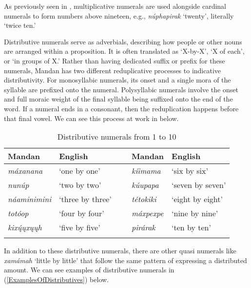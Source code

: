 As previously seen in , multiplicative numerals are used alongside cardinal numerals to form numbers above nineteen, e.g., \textit{núphapirak} `twenty', literally `twice ten.'

\label{SubSubSubDistributive}

Distributive numerals serve as adverbials, describing how people or other nouns are arranged within a proposition. It is often translated as `X-by-X', `X of each', or `in groups of X.' Rather than having dedicated suffix or prefix for these numerals, Mandan has two different reduplicative processes to indicative distributivity. For monosyllabic numerals, its onset and a single mora of the syllable are prefixed onto the numeral. Polysyllabic numerals involve the onset and full moraic weight of the final syllable being suffixed onto the end of the word. If a numeral ends in a consonant, then the reduplication happens before that final vowel. We can see this process at work in  below.

\begin{table}
        \caption{Distributive numerals from 1 to 10}\label{Tab1to10distributive}
    \begin{tabular}{lllll}
\lsptoprule
    \textbf{Mandan}&\textbf{English}& ~&  \textbf{Mandan}&\textbf{English}\\
\midrule
    \textit{máxanana}&`one by one'&~&  \textit{kíimama}&`six by six'\\
    \textit{nunúp}&`two by two'&~&     \textit{kúupapa}&`seven by seven'\\
    \textit{náaminimini}&`three by three'&~&   \textit{tétokiki}&`eight by eight'\\
    \textit{totóop}&`four by four'&~&   \textit{máxpexpe}&`nine by nine'\\
    \textit{kixų́ųxųųh}&`five by five'&~&\textit{pirárak}&`ten by ten'\\\lspbottomrule
    \end{tabular}

\end{table}

In addition to these distributive numerals, there are other quasi numerals like \textit{xamámah} `little by little' that follow the same pattern of expressing a distributed amount. We can see examples of distributive numerals in (\ref{ExamplesOfDistributives}) below.

